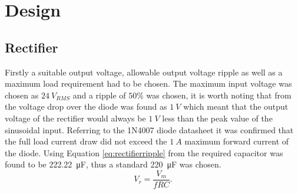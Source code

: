 \section{Design} \label{sec:pwr_design}
 
\subsection{Rectifier}
Firstly a suitable output voltage, allowable output voltage ripple as well as a maximum load requirement had to be chosen. The maximum input voltage was chosen as $\SI{24}{V_{RMS}}$ and a ripple of $50\%$ was chosen, it is worth noting that from \cite{1n4007:2011} the voltage drop over the diode was found as $\SI{1}{V}$ which meant that the output voltage of the rectifier would always be $\SI{1}{V}$ less than the peak value of the sinusoidal input. Referring to the 1N4007 diode datasheet it was confirmed that the full load current draw did not exceed the $\SI{1}{A}$ maximum forward current of the diode. Using Equation \ref{eq:rectifierripple} from \cite{Neaman:2018} the required capacitor was found to be \SI{222.22}{\micro F}, thus a standard \SI{220}{\micro F} was chosen.
\begin{equation}
   V_{r} = \frac{V_{m}}{fRC}
   \label{eq:rectifierripple}. 
\end{equation}

